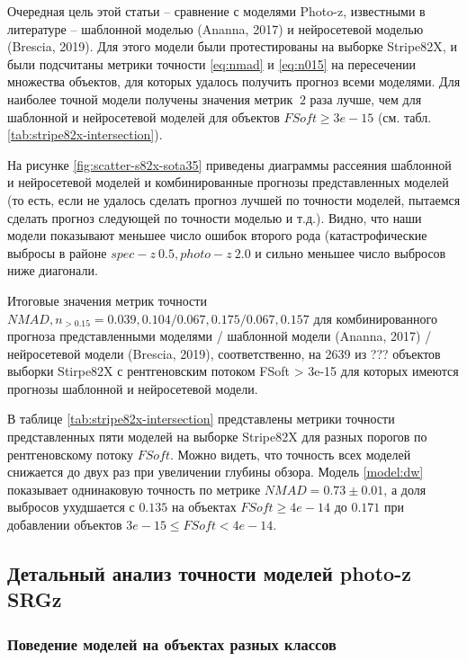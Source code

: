 \documentclass[fleqn,usenatbib]{mnras}
\begin{document}
Очередная цель этой статьи -- сравнение с моделями Photo-z, известными в литературе -- шаблонной моделью (Ananna, 2017) и нейросетевой моделью (Brescia, 2019). Для этого модели были протестированы на выборке Stripe82X, и были подсчитаны метрики точности \eqref{eq:nmad} и \eqref{eq:n015} на пересечении множества объектов, для которых удалось получить прогноз всеми моделями. Для наиболее точной модели получены значения метрик $~2$ раза лучше, чем для шаблонной и нейросетевой моделей для объектов $FSoft \geq 3e-15$ (см. табл. \ref{tab:stripe82x-intersection}).

На рисунке \ref{fig:scatter-s82x-sota35} приведены диаграммы рассеяния шаблонной и нейросетевой моделей и комбинированные прогнозы представленных моделей (то есть, если не удалось сделать прогноз лучшей по точности моделей, пытаемся сделать прогноз следующей по точности моделью и т.д.). Видно, что наши модели показывают меньшее число ошибок второго рода (катастрофические выбросы в районе $spec-z ~ 0.5, photo-z ~ 2.0$ и сильно меньшее число выбросов ниже диагонали.

Итоговые значения метрик точности $NMAD, n_{>0.15} = 0.039, 0.104/ 0.067, 0.175/ 0.067, 0.157$ для комбинированного прогноза представленными моделями / шаблонной модели (Ananna, 2017) / нейросетевой модели (Brescia, 2019), соответственно, на 2639 из ??? объектов выборки Stirpe82X с рентгеновским потоком FSoft > 3e-15 для которых имеются прогнозы шаблонной и нейросетевой модели. 

В таблице \ref{tab:stripe82x-intersection} представлены метрики точности представленных пяти моделей на выборке Stripe82X для разных порогов по рентгеновскому потоку $FSoft$. Можно видеть, что точность всех моделей снижается до двух раз при увеличении глубины обзора. Модель \ref{model:dw} показывает однинаковую точность по метрике $NMAD = 0.73 \pm 0.01$, а доля выбросов ухудшается с $0.135$ на объектах $FSoft \geq 4e-14$ до $0.171$ при добавлении объектов $3e-15 \leq FSoft < 4e-14$.

\clearpage

\subsection{Детальный анализ точности моделей photo-z SRGz}

\subsubsection{Поведение моделей на объектах разных классов}
\end{document}
